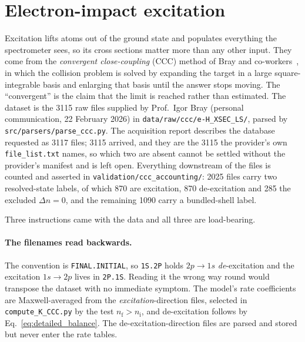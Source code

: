 \section{Electron-impact excitation}
\label{sec:excitation}

Excitation lifts atoms out of the ground state and populates everything the
spectrometer sees, so its cross sections matter more than any other input. They
come from the \emph{convergent close-coupling} (CCC) method of Bray and
co-workers~\cite{BrayStelbovics1992,Bray2002}, in which the collision
problem is solved by
expanding the target in a large square-integrable basis and enlarging that basis
until the answer stops moving. The ``convergent'' is the claim that the limit
is reached rather than estimated. The dataset is the 3115 raw files supplied by
Prof.\ Igor Bray (personal communication, 22 February 2026) in
\texttt{data/raw/ccc/e-H\_XSEC\_LS/}, parsed by
\texttt{src/parsers/parse\_ccc.py}. The acquisition report describes the
database requested as 3117 files; 3115 arrived, and they are the 3115 the
provider's own \texttt{file\_list.txt} names, so which two are absent cannot be
settled without the provider's manifest and is left open. Everything downstream
of the files is counted and asserted in \texttt{validation/ccc\_accounting/}:
2025 files carry two resolved-state labels, of which 870 are excitation, 870
de-excitation and 285 the excluded $\Delta n = 0$, and the remaining 1090 carry
a bundled-shell label.

Three instructions came with the data and all three are load-bearing.

\paragraph{The filenames read backwards.} The convention is
\texttt{FINAL.INITIAL}, so \texttt{1S.2P} holds $2p \to 1s$
\emph{de}-excitation and the excitation $1s \to 2p$ lives in \texttt{2P.1S}.
Reading it the wrong way round would transpose the dataset with no immediate
symptom. The model's rate coefficients are Maxwell-averaged from the
\emph{excitation}-direction files, selected in \texttt{compute\_K\_CCC.py} by
the test $n_{\mathrm f} > n_{\mathrm i}$, and de-excitation follows by
Eq.~\eqref{eq:detailed_balance}. The de-excitation-direction files are parsed
and stored but never enter the rate tables.

